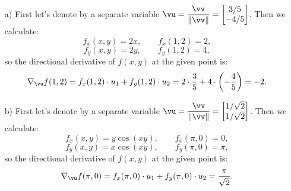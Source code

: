 \begin{solution}
\begin{enumerate}
        \item[a) ] First let's denote by a separate variable $\vu = \dfrac{\vv}{\|\vv\|}=\begin{bmatrix}
            3/5\\-4/5
        \end{bmatrix}$. Then we calculate:
        \[ f_x(x,y) = 2x, \qquad f_x(1,2)=2, \]
        \[ f_y(x,y) = 2y, \qquad f_y(1,2)=4, \]
        so the directional derivative of $f(x,y)$ at the given point is:
        \[ \nabla_\vu f(1,2) = f_x(1,2)\cdot u_1+ f_y(1,2)\cdot u_2 = 2\cdot \dfrac{3}{5} + 4 \cdot \left(-\dfrac{4}{5}\right) = -2. \]
        
        \item[b) ] First let's denote by a separate variable $\vu = \dfrac{\vv}{\|\vv\|}=\begin{bmatrix}
            1/\sqrt{2}\\1/\sqrt{2}
        \end{bmatrix}$. Then we calculate:
        \[ f_x(x,y) = y\cos(xy), \qquad f_x(\pi,0)=0, \]
        \[ f_y(x,y) = x\cos(xy), \qquad f_y(\pi,0)=\pi, \]
        so the directional derivative of $f(x,y)$ at the given point is:
        \[ \nabla_\vu f(\pi,0) = f_x(\pi,0)\cdot u_1+ f_y(\pi,0)\cdot u_2 = \dfrac{\pi}{\sqrt{2}}. \]

        
\end{enumerate}
\end{solution}
\smallskip



